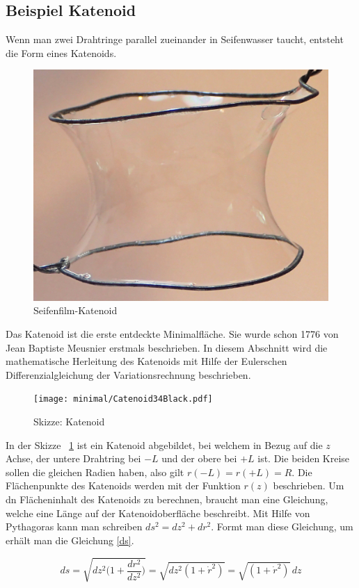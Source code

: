 \begin{refsection}
\subsection{Beispiel Katenoid}
Wenn man zwei Drahtringe parallel zueinander in Seifenwasser taucht, entsteht die Form eines Katenoids. 
\begin{figure}
  \centering
  \includegraphics[scale=0.5]{minimal/Cartenoid_Foto.png}
  \caption{Seifenfilm-Katenoid} 
\end{figure}
Das Katenoid ist die erste entdeckte Minimalfläche.
Sie wurde schon 1776 von Jean Baptiste Meusnier erstmals beschrieben.
In diesem Abschnitt wird die mathematische Herleitung des Katenoids mit Hilfe der Eulerschen Differenzialgleichung der Variationsrechnung beschrieben.
\begin{figure}
  \centering
  \texttt{[image: minimal/Catenoid34Black.pdf]}
  \caption{Skizze: Katenoid} 
  \label{Katenoid}
\end{figure}
In der Skizze ~\ref{Katenoid} ist ein Katenoid abgebildet, bei welchem in Bezug auf die $z$ Achse, der untere Drahtring bei $-L$ und der obere bei $+L$ ist. 
Die beiden Kreise sollen die gleichen Radien haben, also gilt $r(-L)=r(+L)=R$. 
Die Flächenpunkte des Katenoids werden mit der Funktion $r(z)$ beschrieben. 
Um dn Flächeninhalt des Katenoids zu berechnen, braucht man eine Gleichung, welche eine Länge auf der Katenoidoberfläche beschreibt. 
Mit Hilfe von Pythagoras kann man schreiben $ds^2=dz^2+dr^2$.
Formt man diese Gleichung, um erhält man die Gleichung \eqref{ds}.

\begin{equation} \label{ds}
  ds=\sqrt{dz^2\bigg(1+\frac{dr^2}{dz^2}\bigg)}= \sqrt{dz^2(1+\dot r^2)}=\sqrt{(1+\dot r^2)}\,dz
\end{equation}

\end{refsection}
